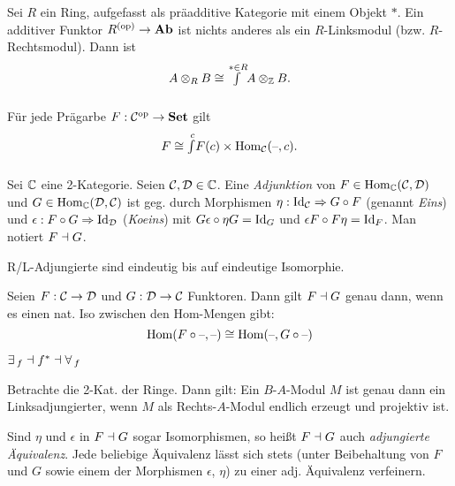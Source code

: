 \documentclass{cheat-sheet}
\begin{document}
\begin{bsp}
  Sei $R$ ein Ring, aufgefasst als präadditive Kategorie mit einem Objekt $*$.
  Ein additiver Funktor $R^{(\mathrm{op})} \to \mathbf{Ab}$ ist nichts anderes als ein $R$-Linksmodul (bzw. $R$-Rechtsmodul). Dann ist
  \[ A \otimes_R B \cong {\textstyle \int\limits_{}^{* \in R}} A \otimes_{\mathbb{Z}} B. \]
\end{bsp}

\begin{bsp}
  Für jede Prägarbe $F : \mathcal{C}^{\mathrm{op}} \to \mathbf{Set}$ gilt
  \[ F \cong {\textstyle \int\limits_{}^{c}} F(c) \times \operatorname{Hom}_{\mathcal{C}}(\text{--}, c). \]
\end{bsp}

\begin{defn}
  Sei $\mathbb{C}$ eine 2-Kategorie. Seien $\mathcal{C}, \mathcal{D} \in \mathbb{C}$. Eine \emph{Adjunktion} von $F \in \operatorname{Hom}_{\mathbb{C}}(\mathcal{C}, \mathcal{D})$ und $G \in \operatorname{Hom}_{\mathbb{C}}(\mathcal{D}, \mathcal{C})$ ist geg. durch Morphismen $\eta : \operatorname{Id}_{\mathcal{C}} \Rightarrow G \circ F$ (genannt \emph{Eins}) und $\epsilon : F \circ G \Rightarrow \operatorname{Id}_{\mathcal{D}}$ (\emph{Koeins}) mit $G \epsilon \circ \eta G = \operatorname{Id}_G$ und $\epsilon F \circ F \eta = \operatorname{Id}_F$.
  Man notiert $F \dashv G$.
\end{defn}

\begin{lem}
  R/L-Adjungierte sind eindeutig bis auf eindeutige Isomorphie.
\end{lem}

\begin{bem}
  Seien $F : \mathcal{C} \to \mathcal{D}$ und $G : \mathcal{D} \to \mathcal{C}$ Funktoren. Dann gilt $F \dashv G$ genau dann, wenn es einen nat. Iso zwischen den Hom-Mengen gibt:
  \[ \operatorname{Hom}(F \circ \text{--}, \text{--}) \cong \operatorname{Hom}(\text{--}, G \circ \text{--}) \]
\end{bem}

\begin{bsp}
  $\exists \,_f \dashv f^* \dashv \forall \,_f$
\end{bsp}

\begin{bsp}
  Betrachte die 2-Kat. der Ringe. Dann gilt: Ein $B$-$A$-Modul $M$ ist genau dann ein Linksadjungierter, wenn $M$ als Rechts-$A$-Modul endlich erzeugt und projektiv ist.
\end{bsp}

\begin{bem}
  Sind $\eta$ und $\epsilon$ in $F \dashv G$ sogar Isomorphismen, so heißt $F \dashv G$ auch \emph{adjungierte Äquivalenz}. Jede beliebige Äquivalenz lässt sich stets (unter Beibehaltung von $F$ und $G$ sowie einem der Morphismen $\epsilon$, $\eta$) zu einer adj. Äquivalenz verfeinern.
\end{bem}
\end{document}
